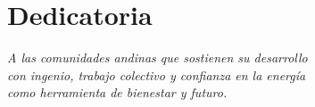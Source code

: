 \thispagestyle{empty}

\chapter*{Dedicatoria}

\vspace*{6cm}

\begin{flushright}
\textit{A las comunidades andinas que sostienen su desarrollo}\\
\textit{con ingenio, trabajo colectivo y confianza en la energía}\\
\textit{como herramienta de bienestar y futuro.}
\end{flushright}

